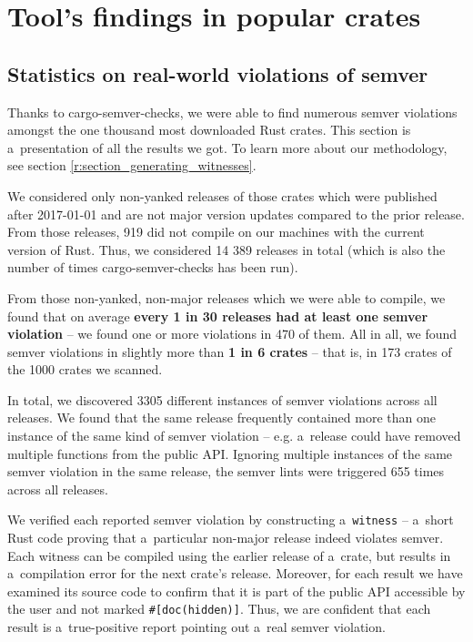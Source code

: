 \documentclass[licencjacka,en]{pracamgr}
\begin{document}

\chapter{Tool's findings in popular crates}\label{r:chapter_semver_crater}

\section{Statistics on real-world violations of semver}\label{r:section_results_statistics}

Thanks to cargo-semver-checks, we were able to find numerous semver violations
amongst the one thousand most downloaded Rust crates.
This section is a~presentation of all the results we got. To learn more about
our methodology, see section \ref{r:section_generating_witnesses}.

We considered only non-yanked releases of those crates which were published
after 2017-01-01 and are not major version updates compared to the prior release. From those releases,
919 did not compile on our machines with the current version of Rust.
Thus, we considered 14 389 releases in total (which is also the number of times
cargo-semver-checks has been run).

From those non-yanked, non-major releases which we were able to compile, we found that
on average \textbf{every 1 in 30 releases had at least one semver violation}
-- we found one or more violations in 470 of them.
All in all, we found semver violations in slightly more than \textbf{1 in 6 crates}
-- that is, in 173 crates of the 1000 crates we scanned.

In total, we discovered 3305 different instances of semver violations across all releases.
We found that the same release frequently contained more than one instance of the same kind of semver violation --
e.g. a~release could have removed multiple functions from the public API. Ignoring multiple instances
of the same semver violation in the same release, the semver lints were triggered 655 times across all releases.

We verified each reported semver violation by constructing a~\texttt{witness} -- a~short Rust code
proving that a~particular non-major release indeed violates semver.
Each witness can be compiled using the earlier release of a~crate,
but results in a~compilation error for the next crate's release.
Moreover, for each result we have examined its source code to confirm
that it is part of the public API accessible by the user and not marked \texttt{\#[doc(hidden)]}. Thus, we are confident that each
result is a~true-positive report pointing out a~real semver violation.
\end{document}
